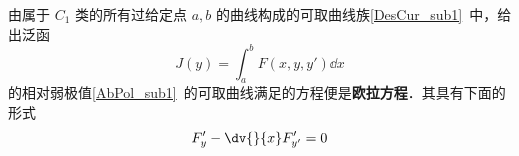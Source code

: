 
由属于 $C_1$ 类的所有过给定点 $a,b$ 的曲线构成的可取曲线族\autoref{DesCur_sub1}~中，给出泛函 
\begin{equation}
J(y)=\int_a^bF(x,y,y')\dd x
\end{equation}
的相对弱极值\autoref{AbPol_sub1}~的可取曲线满足的方程便是\textbf{欧拉方程}．其具有下面的形式
\begin{equation}
F'_y-\dv{}{x}F'_{y'}=0
\end{equation}
